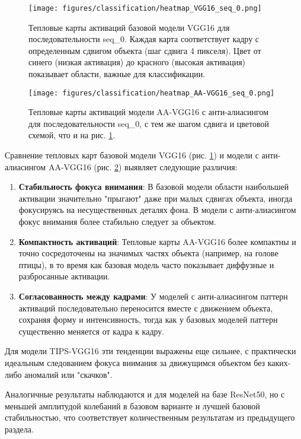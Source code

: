 \begin{figure}[ht]
\centering
\texttt{[image: figures/classification/heatmap\_VGG16\_seq\_0.png]}
\caption{Тепловые карты активаций базовой модели VGG16 для последовательности seq\_0. Каждая карта соответствует кадру с определенным сдвигом объекта (шаг сдвига 4 пикселя). Цвет от синего (низкая активация) до красного (высокая активация) показывает области, важные для классификации.}
\label{fig:heatmap_vgg16}
\end{figure}

\begin{figure}[ht]
\centering
\texttt{[image: figures/classification/heatmap\_AA-VGG16\_seq\_0.png]}
\caption{Тепловые карты активаций модели AA-VGG16 с анти-алиасингом для последовательности seq\_0, с тем же шагом сдвига и цветовой схемой, что и на рис. \ref{fig:heatmap_vgg16}.}
\label{fig:heatmap_aa_vgg16}
\end{figure}

Сравнение тепловых карт базовой модели VGG16 (рис. \ref{fig:heatmap_vgg16}) и модели с анти-алиасингом AA-VGG16 (рис. \ref{fig:heatmap_aa_vgg16}) выявляет следующие различия:

\begin{enumerate}
    \item \textbf{Стабильность фокуса внимания}: В базовой модели области наибольшей активации значительно "прыгают" даже при малых сдвигах объекта, иногда фокусируясь на несущественных деталях фона. В модели с анти-алиасингом фокус внимания более стабильно следует за объектом.
    
    \item \textbf{Компактность активаций}: Тепловые карты AA-VGG16 более компактны и точно сосредоточены на значимых частях объекта (например, на голове птицы), в то время как базовая модель часто показывает диффузные и разбросанные активации.
    
    \item \textbf{Согласованность между кадрами}: У моделей с анти-алиасингом паттерн активаций последовательно переносится вместе с движением объекта, сохраняя форму и интенсивность, тогда как у базовых моделей паттерн существенно меняется от кадра к кадру.
\end{enumerate}

Для модели TIPS-VGG16 эти тенденции выражены еще сильнее, с практически идеальным следованием фокуса внимания за движущимся объектом без каких-либо аномалий или "скачков".

Аналогичные результаты наблюдаются и для моделей на базе ResNet50, но с меньшей амплитудой колебаний в базовом варианте и лучшей базовой стабильностью, что соответствует количественным результатам из предыдущего раздела.


